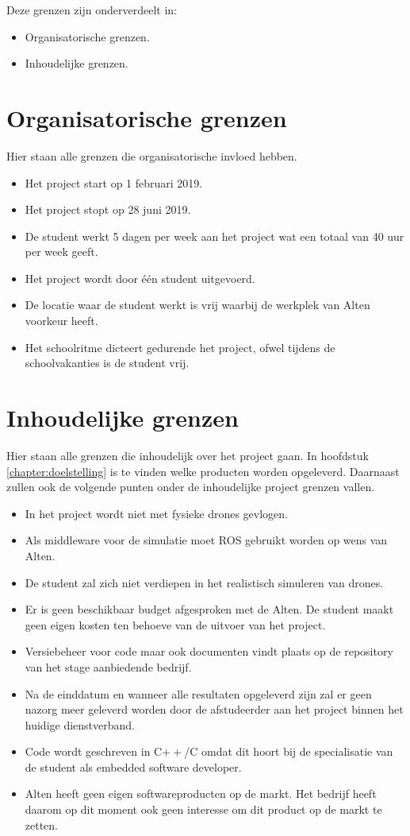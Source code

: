 \documentclass[a4paper, 11pt, oneside]{report}
\begin{document}
Deze grenzen zijn onderverdeelt in:

\begin{itemize}
	\item Organisatorische grenzen.
	\item Inhoudelijke grenzen.
\end{itemize}

\section{Organisatorische grenzen}
Hier staan alle grenzen die organisatorische invloed hebben. 

\begin{itemize}
	\item Het project start op 1 februari 2019.
	\item Het project stopt op 28 juni 2019.
	\item De student werkt 5 dagen per week aan het project wat een totaal van 40 uur per week geeft.
	\item Het project wordt door één student uitgevoerd.
	\item De locatie waar de student werkt is vrij waarbij de werkplek van Alten voorkeur heeft.
	\item Het schoolritme dicteert gedurende het project, ofwel tijdens de schoolvakanties is de student vrij.
\end{itemize}

\section{Inhoudelijke grenzen}
Hier staan alle grenzen die inhoudelijk over het project gaan. In hoofdstuk \ref{chapter:doelstelling} is te vinden welke producten worden opgeleverd. Daarnaast zullen ook de volgende punten onder de inhoudelijke project grenzen vallen.

\begin{itemize}
	\item In het project wordt niet met fysieke drones gevlogen.
	\item Als middleware voor de simulatie moet ROS gebruikt worden op wens van Alten.
	\item De student zal zich niet verdiepen in het realistisch simuleren van drones.
	\item Er is geen beschikbaar budget afgesproken met de Alten. De student maakt geen eigen kosten ten behoeve van de uitvoer van het	project. 
	\item Versiebeheer voor code maar ook documenten vindt plaats op de repository van het stage aanbiedende bedrijf.
	\item Na de einddatum en wanneer alle resultaten opgeleverd zijn zal er geen nazorg meer geleverd	worden door de afstudeerder aan het project binnen het huidige dienstverband.
	\item Code wordt geschreven in C$++$/C omdat dit hoort bij de specialisatie van de student als embedded software developer.
	\item Alten heeft geen eigen softwareproducten op de markt.
	Het bedrijf heeft daarom op dit moment ook geen interesse om dit product op de markt te zetten.
\end{itemize}
\end{document}

